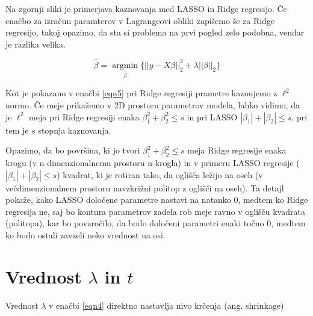 \documentclass[onecolumn]{report}
\begin{document}
Na zgornji sliki je primerjava kaznovanja med LASSO in Ridge regresijo. Če enačbo za izračun paramterov v Lagrangeovi obliki zapišemo še za Ridge regresijo, takoj opazimo, da sta si problema na prvi pogled zelo podobna, vendar je razlika velika.

\begin{equation}
	\hat{\beta} =  \underset{\hat{\beta}}{\operatorname{argmin}} \{ ||y - X\beta||_2^2 + \lambda ||\beta||_2 \}
	\label{eqn5} 
\end{equation}

Kot je pokazano v enačbi \eqref{eqn5} pri Ridge regresiji prametre kaznujemo z $\ell^2$ normo. Če meje prikažemo v 2D prostoru parametrov modela, lahko vidimo, da je $\ell^2$ meja pri Ridge regresiji enaka $\beta_1^2 +\beta_2^2 \leq s$ in pri LASSO $|\beta_1| + |\beta_2| \leq s$, pri tem je $s$ stopnja kaznovanja. 

Opazimo, da bo površina, ki jo tvori $\beta_1^2 +\beta_2^2 \leq s$ meja Ridge regresije enaka krogu (v n-dimenzionalnemu prostoru n-krogla) in v primeru LASSO regresije ($|\beta_1| + |\beta_2| \leq s$) kvadrat, ki je rotiran tako, da oglišča ležijo na oseh (v večdimenzionalnem prostoru navzkrižni politop z oglišči na oseh). Ta detajl pokaže, kako LASSO določene parametre nastavi na natanko 0, medtem ko Ridge regresija ne, saj bo kontura parametrov zadela rob meje ravno v oglišču kvadrata (politopa), kar bo povzročilo, da bodo določeni parametri enaki točno 0, medtem ko bodo ostali zavzeli neko vrednost na osi.

\section*{Vrednost $\lambda$ in $t$}

Vrednost $\lambda$ v enačbi \eqref{eqn4} direktno nastavlja nivo krčenja (ang. shrinkage)
\end{document}
